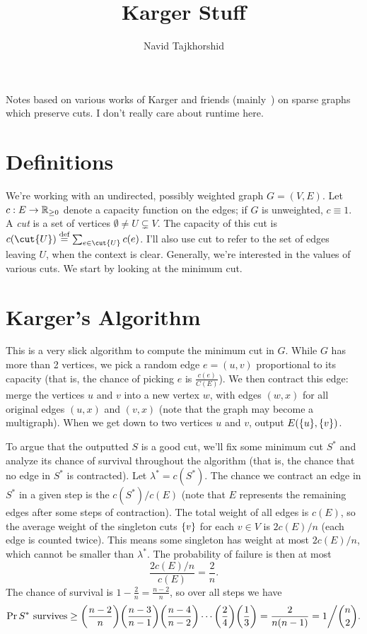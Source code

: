 \documentclass[12pt]{article}
\begin{document}
\title{Karger Stuff}
\author{Navid Tajkhorshid}

\maketitle

Notes based on various works of Karger and friends (mainly~\cite{BK02}) on
sparse graphs which preserve cuts. I don't really care about runtime here.

\section{Definitions}

We're working with an undirected, possibly weighted graph $G = (V, E)$. Let
$c : E \to \mathbb{R}_{\geq 0}$ denote a capacity function on the edges; if $G$ is
unweighted, $c \equiv 1$. A \emph{cut} is a set of vertices
$\emptyset \neq U \subsetneq V$. The capacity of this cut is
$c(\cut{U}) \defeq \sum_{e \in \cut{U}}c(e)$. I'll also use cut to refer to the
set of edges leaving $U$, when the context is clear. Generally, we're interested
in the values of various cuts. We start by looking at the minimum cut.

\section{Karger's Algorithm}

This is a very slick algorithm to compute the minimum cut in $G$. While $G$ has
more than 2 vertices, we pick a random edge $e = (u, v)$ proportional to its
capacity (that is, the chance of picking $e$ is $\frac{c( e )}{C(E)}$). We then
contract this edge: merge the vertices $u$ and $v$ into a new vertex $w$, with
edges $(w, x)$ for all original edges $(u, x)$ and $(v, x)$ (note that the graph
may become a multigraph). When we get down to two vertices $u$ and $v$, output
$E(\Set{u}, \Set{v})$.

To argue that the outputted $S$ is a good cut, we'll fix some minimum cut $S^*$
and analyze its chance of survival throughout the algorithm (that is, the chance
that no edge in $S^*$ is contracted). Let $\lambda^* = c(S^*)$. The chance we
contract an edge in $S^*$ in a given step is the $c(S^*)/c(E)$ (note that $E$
represents the remaining edges after some steps of contraction). The total
weight of all edges is $c(E)$, so the average weight of the singleton cuts
$\Set{v}$ for each $v \in V$ is $2c(E)/n$ (each edge is counted twice). This
means some singleton has weight at most $2c(E)/n$, which cannot be smaller than
$\lambda^*$. The probability of failure is then at most
\[
  \frac{2c(E)/n}{c(E)} = \frac{2}{n}.
\]
The chance of survival is $1 - \frac{2}{n} = \frac{n - 2}{n}$, so over all steps
we have
\begin{align*}
  \Pr{S^* \text{ survives}} \geq \prac{n - 2}{n}\prac{n - 3}{n - 1}\prac{n - 4}{n - 2}\cdots\prac{2}{4}\prac{1}{3}
                            =    \frac{2}{n(n - 1)}
                            =    1\bigg/\binom{n}{2}.
\end{align*}
\end{document}
